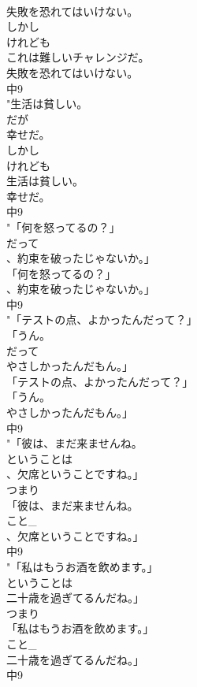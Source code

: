 \documentclass[8pt]{extreport}
\begin{document}
\begin{CJK}{UTF8}{min}
\\	失敗を恐れてはいけない。
\\	しかし 
\\	けれども	
\\	これは難しいチャレンジだ。
\\	失敗を恐れてはいけない。
\\	中9
\\	"生活は貧しい。
\\	だが
\\	幸せだ。
\\	しかし 
\\	けれども	
\\	生活は貧しい。
\\	幸せだ。
\\	中9
\\	"「何を怒ってるの？」
\\	だって
\\	、約束を破ったじゃないか。」
\\	「何を怒ってるの？」
\\	、約束を破ったじゃないか。」
\\	中9
\\	"「テストの点、よかったんだって？」
\\	「うん。
\\	だって
\\	やさしかったんだもん。」
\\	「テストの点、よかったんだって？」
\\	「うん。
\\	やさしかったんだもん。」
\\	中9
\\	"「彼は、まだ来ませんね。
\\	ということは
\\	、欠席ということですね。」
\\	つまり	
\\	「彼は、まだ来ませんね。
\\	こと_
\\	、欠席ということですね。」
\\	中9
\\	"「私はもうお酒を飲めます。」
\\	ということは
\\	二十歳を過ぎてるんだね。」
\\	つまり	
\\	「私はもうお酒を飲めます。」
\\	こと_
\\	二十歳を過ぎてるんだね。」
\\	中9

\end{CJK}
\end{document}
